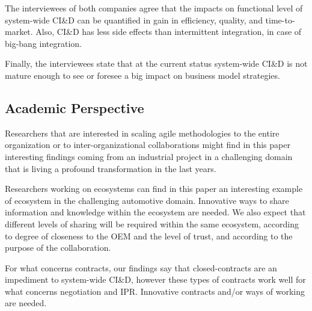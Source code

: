 The interviewees of both companies agree that the impacts on functional level of system-wide CI\&D %
can be quantified in gain in efficiency, quality, and time-to-market. Also, CI\&D has less side effects than intermittent integration, in case of big-bang integration.  

Finally, the interviewees state that at the current status system-wide CI\&D is not mature enough to see or foresee a big impact on business model strategies. 

\subsection{Academic Perspective}

Researchers that are interested in scaling agile methodologies to the entire organization or to inter-organizational collaborations might find in this paper interesting findings coming from an industrial project in a challenging domain that is living a profound transformation in the last years. 

Researchers working on ecosystems can find in this paper an interesting example of ecosystem in the challenging automotive domain. Innovative ways to share information and knowledge within the ecosystem are needed. %
We also expect that different levels of sharing will be required within the same ecosystem, according to degree of closeness to the OEM and the level of trust, and according to the purpose of the collaboration.

For what concerns contracts, our findings say that closed-contracts are an impediment to system-wide CI\&D, however these types of contracts work well for what concerns negotiation and IPR. Innovative contracts and/or ways of working are needed.

% 

